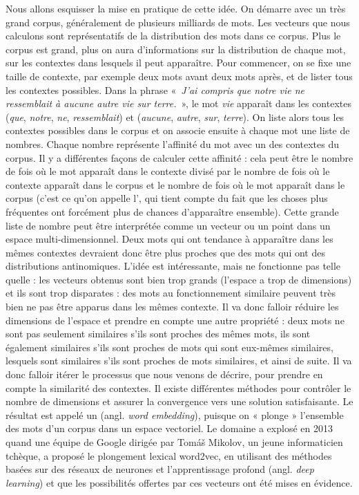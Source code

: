 {Nous allons esquisser la mise en pratique de cette idée. On démarre avec un très grand corpus, généralement de plusieurs milliards de mots. Les vecteurs que nous calculons sont représentatifs de la distribution des mots dans ce corpus. Plus le corpus est grand, plus on aura d’informations sur la distribution de chaque mot, sur les contextes dans lesquels il peut apparaître. Pour commencer, on se fixe une taille de contexte, par exemple deux mots avant deux mots après, et de lister tous les contextes possibles. Dans la phrase «~\textit{J’ai compris que notre vie ne ressemblait à aucune autre vie sur terre.}~», le mot \textit{vie} apparaît dans les contextes (\textit{que}, \textit{notre}, \textit{ne}, \textit{ressemblait}) et (\textit{aucune}, \textit{autre}, \textit{sur}, \textit{terre}). On liste alors tous les contextes possibles dans le corpus et on associe ensuite à chaque mot une liste de nombres. Chaque nombre représente l’affinité du mot avec un des contextes du corpus. Il y a différentes façons de calculer cette affinité : cela peut être le nombre de fois où le mot apparaît dans le contexte divisé par le nombre de fois où le contexte apparaît dans le corpus et le nombre de fois où le mot apparaît dans le corpus (c’est ce qu’on appelle l’, qui tient compte du fait que les choses plus fréquentes ont forcément plus de chances d’apparaître ensemble). Cette grande liste de nombre peut être interprétée comme un vecteur ou un point dans un espace multi-dimensionnel. Deux mots qui ont tendance à apparaître dans les mêmes contextes devraient donc être plus proches que des mots qui ont des distributions antinomiques. L’idée est intéressante, mais ne fonctionne pas telle quelle : les vecteurs obtenus sont bien trop grands
(l’espace a trop de dimensions) et ils sont trop disparates : des mots au fonctionnement similaire peuvent très bien ne pas être apparus dans les mêmes contexte. Il va donc falloir réduire les dimensions de l’espace et prendre en compte une autre propriété : deux mots ne sont pas seulement similaires s’ils sont proches des mêmes mots, ils sont également similaires s’ils sont proches de mots qui sont eux-mêmes similaires, lesquels sont similaires s'ils sont proches de mots similaires, et ainsi de suite. Il va donc falloir itérer le processus que nous venons de décrire, pour prendre en compte la similarité des contextes. Il existe différentes méthodes pour contrôler le nombre de dimensions et assurer la convergence vers une solution satisfaisante. Le résultat est appelé
un  (angl. \textit{word embedding}), puisque on « plonge » l’ensemble des mots d’un corpus dans un espace vectoriel. Le domaine a explosé en 2013 quand une équipe de Google dirigée par Tomáš Mikolov, un jeune informaticien tchèque, a proposé le plongement lexical word2vec, en utilisant des méthodes basées sur des réseaux de neurones et l’apprentissage profond (angl. \textit{deep learning}) et que les possibilités offertes par ces vecteurs ont été mises en évidence.

}
